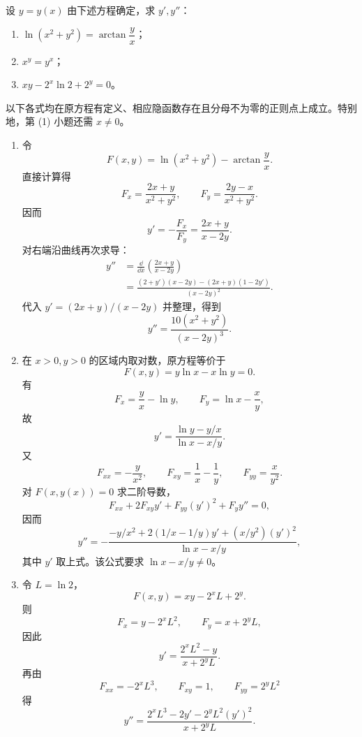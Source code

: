 \begin{xexercise}[1]
设 $y=y(x)$ 由下述方程确定，求 $y',y''$：
  \begin{enumerate}[label=(\arabic*)]
    \item $\ln(x^2+y^2)=\arctan\dfrac{y}{x}$；
    \item $x^y=y^x$；
    \item $xy-2^x\ln2+2^y=0$。
  \end{enumerate}
\end{xexercise}
\begin{xsolution}
以下各式均在原方程有定义、相应隐函数存在且分母不为零的正则点上成立。特别地，第 (1) 小题还需 $x\ne0$。

\begin{enumerate}[label=(\arabic*)]
  \item 令
  \[
    F(x,y)=\ln(x^2+y^2)-\arctan\frac yx.
  \]
  直接计算得
  \[
    F_x=\frac{2x+y}{x^2+y^2},\qquad
    F_y=\frac{2y-x}{x^2+y^2}.
  \]
  因而
  \[
    y'=-\frac{F_x}{F_y}
    =\frac{2x+y}{x-2y}.
  \]
  对右端沿曲线再次求导：
  \begin{align*}
    y''
    &=\frac{\dd}{\dd x}\left(\frac{2x+y}{x-2y}\right)\\
    &=\frac{(2+y')(x-2y)-(2x+y)(1-2y')}{(x-2y)^2}.
  \end{align*}
  代入 $y'=(2x+y)/(x-2y)$ 并整理，得到
  \[
    \boxed{\displaystyle
      y''=\frac{10(x^2+y^2)}{(x-2y)^3}}.
  \]

  \item 在 $x>0,y>0$ 的区域内取对数，原方程等价于
  \[
    F(x,y)=y\ln x-x\ln y=0.
  \]
  有
  \[
    F_x=\frac yx-\ln y,
    \qquad
    F_y=\ln x-\frac xy,
  \]
  故
  \[
    \boxed{\displaystyle
      y'=\frac{\ln y-y/x}{\ln x-x/y}}.
  \]
  又
  \[
    F_{xx}=-\frac{y}{x^2},\qquad
    F_{xy}=\frac1x-\frac1y,
    \qquad
    F_{yy}=\frac{x}{y^2}.
  \]
  对 $F(x,y(x))=0$ 求二阶导数，
  \[
    F_{xx}+2F_{xy}y'+F_{yy}(y')^2+F_yy''=0,
  \]
  因而
  \[
    \boxed{\displaystyle
      y''=
      -\frac{-y/x^2+2(1/x-1/y)y'+(x/y^2)(y')^2}
      {\ln x-x/y}},
  \]
  其中 $y'$ 取上式。该公式要求 $\ln x-x/y\ne0$。

  \item 令 $L=\ln2$，
  \[
    F(x,y)=xy-2^xL+2^y.
  \]
  则
  \[
    F_x=y-2^xL^2,
    \qquad
    F_y=x+2^yL,
  \]
  因此
  \[
    \boxed{\displaystyle
      y'=\frac{2^xL^2-y}{x+2^yL}}.
  \]
  再由
  \[
    F_{xx}=-2^xL^3,\qquad F_{xy}=1,\qquad F_{yy}=2^yL^2
  \]
  得
  \[
    \boxed{\displaystyle
      y''=\frac{2^xL^3-2y'-2^yL^2(y')^2}{x+2^yL}}.
  \]
\end{enumerate}
\end{xsolution}


